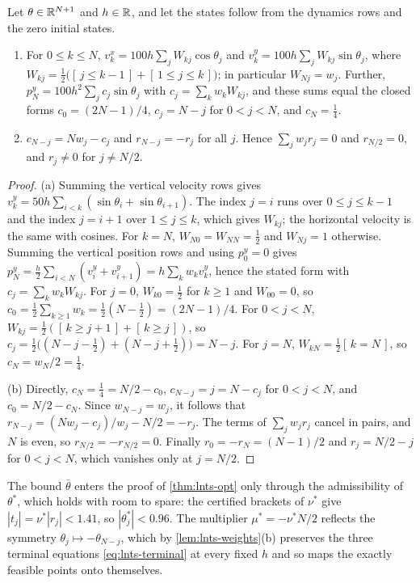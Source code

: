 \begin{lemma}\label{lem:lnts-weights}
Let $\theta\in\mathbb{R}^{N+1}$ and $h\in\mathbb{R}$, and let the states follow from the dynamics rows and the zero initial states.
\begin{enumerate}
\item[(a)] For $0\le k\le N$, $v^x_k=100h\sum_jW_{kj}\cos\theta_j$ and $v^y_k=100h\sum_jW_{kj}\sin\theta_j$, where $W_{kj}=\tfrac12\bigl([\,j\le k-1\,]+[\,1\le j\le k\,]\bigr)$; in particular $W_{Nj}=w_j$.
Further, $p^y_N=100h^2\sum_jc_j\sin\theta_j$ with $c_j=\sum_kw_kW_{kj}$, and these sums equal the closed forms $c_0=(2N-1)/4$, $c_j=N-j$ for $0<j<N$, and $c_N=\tfrac14$.
\item[(b)] $c_{N-j}=Nw_j-c_j$ and $r_{N-j}=-r_j$ for all $j$.
Hence $\sum_jw_jr_j=0$ and $r_{N/2}=0$, and $r_j\ne0$ for $j\ne N/2$.
\end{enumerate}
\end{lemma}

\begin{proof}
(a) Summing the vertical velocity rows gives $v^y_k=50h\sum_{i<k}(\sin\theta_i+\sin\theta_{i+1})$.
The index $j=i$ runs over $0\le j\le k-1$ and the index $j=i+1$ over $1\le j\le k$, which gives $W_{kj}$; the horizontal velocity is the same with cosines.
For $k=N$, $W_{N0}=W_{NN}=\tfrac12$ and $W_{Nj}=1$ otherwise.
Summing the vertical position rows and using $p^y_0=0$ gives $p^y_N=\tfrac h2\sum_{i<N}(v^y_i+v^y_{i+1})=h\sum_kw_kv^y_k$, hence the stated form with $c_j=\sum_kw_kW_{kj}$.
For $j=0$, $W_{k0}=\tfrac12$ for $k\ge1$ and $W_{00}=0$, so $c_0=\tfrac12\sum_{k\ge1}w_k=\tfrac12(N-\tfrac12)=(2N-1)/4$.
For $0<j<N$, $W_{kj}=\tfrac12([\,k\ge j+1\,]+[\,k\ge j\,])$, so $c_j=\tfrac12\bigl((N-j-\tfrac12)+(N-j+\tfrac12)\bigr)=N-j$.
For $j=N$, $W_{kN}=\tfrac12[\,k=N\,]$, so $c_N=w_N/2=\tfrac14$.

(b) Directly, $c_N=\tfrac14=N/2-c_0$, $c_{N-j}=j=N-c_j$ for $0<j<N$, and $c_0=N/2-c_N$.
Since $w_{N-j}=w_j$, it follows that $r_{N-j}=(Nw_j-c_j)/w_j-N/2=-r_j$.
The terms of $\sum_jw_jr_j$ cancel in pairs, and $N$ is even, so $r_{N/2}=-r_{N/2}=0$.
Finally $r_0=-r_N=(N-1)/2$ and $r_j=N/2-j$ for $0<j<N$, which vanishes only at $j=N/2$.
\end{proof}

The bound $\bar\theta$ enters the proof of \cref{thm:lnts-opt} only through the admissibility of $\theta^*$, which holds with room to spare: the certified brackets of $\nu^*$ give $|t_j|=\nu^*|r_j|<1.41$, so $|\theta^*_j|<0.96$.
The multiplier $\mu^*=-\nu^*N/2$ reflects the symmetry $\theta_j\mapsto-\theta_{N-j}$, which by \cref{lem:lnts-weights}(b) preserves the three terminal equations \eqref{eq:lnts-terminal} at every fixed $h$ and so maps the exactly feasible points onto themselves.

